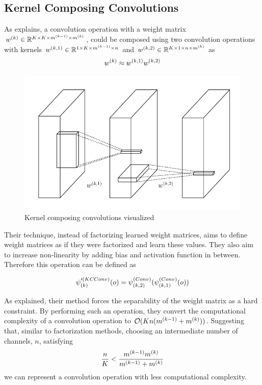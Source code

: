 \subsection{Kernel Composing Convolutions}
As  \cite{alvarez2016decomposeme} explains, a convolution operation with a weight matrix $w^{(k)} \in \mathbb{R}^{K \times K \times m^{(k-1)} \times m^{(k)}}$, could be composed using two convolution operations with kernels $w^{(k,1)} \in \mathbb{R}^{1 \times K \times m^{(k-1)} \times n}$ and $w^{(k,2)} \in \mathbb{R}^{K \times 1 \times n \times m^{(k)}}$ as
$$ w^{(k)} \approx w^{(k,1)} w^{(k,2)} $$
\begin{figure}[!h]
  \begin{centering}
  \includegraphics[width=.9\textwidth]{images/kernel_composing.pdf}
  \caption{Kernel composing convolutions visualized}
    \end{centering}
  \label{fig:depthwise_conv}
\end{figure}

Their technique, instead of factorizing learned weight matrices, aims to define weight matrices as if they were factorized and learn these values. They also aim to increase non-linearity by adding bias and activation function in between. Therefore this operation can be defined as

$$ \psi_{(k)}'^{(KCConv)}(o) = \psi^{(Conv)}_{(k,2)}(\psi^{(Conv)}_{(k,1)}(o))$$

As \cite{alvarez2016decomposeme} explained, their method forces the separability of the weight matrix as a hard constraint. By performing such an operation, they convert the computational complexity of a convolution operation to $\mathcal{O}(K n(m^{(k-1)} +m^{(k)}))$. Suggesting that, similar to factorization methods, choosing an intermediate number of channels, $n$, satisfying
\begin{equation*}
\frac{n}{K} < \frac{m^{(k-1)}m^{(k)}}{m^{(k-1)}+m^{(k)}}
\end{equation*}
we can represent a convolution operation with less computational complexity.


